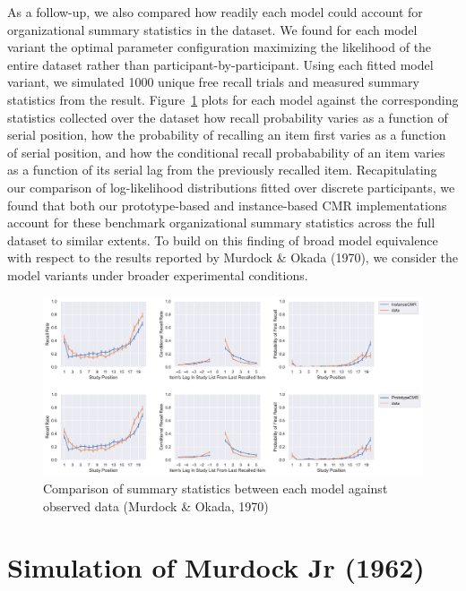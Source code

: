 \documentclass[
  letterpaper,
  DIV=11]{article}
\begin{document}
As a follow-up, we also compared how readily each model could account
for organizational summary statistics in the dataset. We found for each
model variant the optimal parameter configuration maximizing the
likelihood of the entire dataset rather than participant-by-participant.
Using each fitted model variant, we simulated 1000 unique free recall
trials and measured summary statistics from the result.
Figure~\ref{fig-murdokasummary} plots for each model against the
corresponding statistics collected over the dataset how recall
probability varies as a function of serial position, how the probability
of recalling an item first varies as a function of serial position, and
how the conditional recall probabability of an item varies as a function
of its serial lag from the previously recalled item. Recapitulating our
comparison of log-likelihood distributions fitted over discrete
participants, we found that both our prototype-based and instance-based
CMR implementations account for these benchmark organizational summary
statistics across the full dataset to similar extents. To build on this
finding of broad model equivalence with respect to the results reported
by Murdock \& Okada (1970), we consider the model variants under broader
experimental conditions.

\begin{figure}

{\centering \includegraphics{./figures/overall_murdock1970.pdf}

}

\caption{\label{fig-murdokasummary}Comparison of summary statistics
between each model against observed data (Murdock \& Okada, 1970)}

\end{figure}

\hypertarget{simulation-of-murdock-jr-1962}{%
\section{Simulation of Murdock Jr
(1962)}\label{simulation-of-murdock-jr-1962}}
\end{document}
